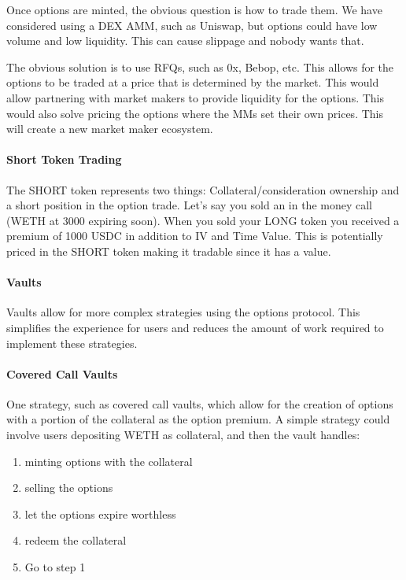 Once options are minted, the obvious question is how to trade them. We
have considered using a DEX AMM, such as Uniswap, but options could have
low volume and low liquidity. This can cause slippage and nobody wants
that.

The obvious solution is to use RFQs, such as 0x, Bebop, etc. This allows
for the options to be traded at a price that is determined by the
market. This would allow partnering with market makers to provide
liquidity for the options. This would also solve pricing the options
where the MMs set their own prices. This will create a new market maker
ecosystem.

\paragraph*{Short Token Trading}

The SHORT token represents two things:
Collateral/consideration ownership and a short position in the option
trade. Let's say you sold an in the money call (WETH at 3000 expiring
soon). When you sold your LONG token you received a premium of 1000 USDC
in addition to IV and Time Value. This is potentially priced in the
SHORT token making it tradable since it has a value.

\paragraph*{Vaults}

Vaults allow for more complex strategies using the options protocol.
This simplifies the experience for users and reduces the amount of work
required to implement these strategies.

\paragraph*{Covered Call Vaults}

One strategy, such as covered call vaults, which allow for the creation
of options with a portion of the collateral as the option premium. A
simple strategy could involve users depositing WETH as collateral, and
then the vault handles:
\begin{enumerate}
\item minting options with the collateral
\item selling the options
\item let the options expire worthless
\item redeem the collateral
\item Go to step 1
\end{enumerate}

